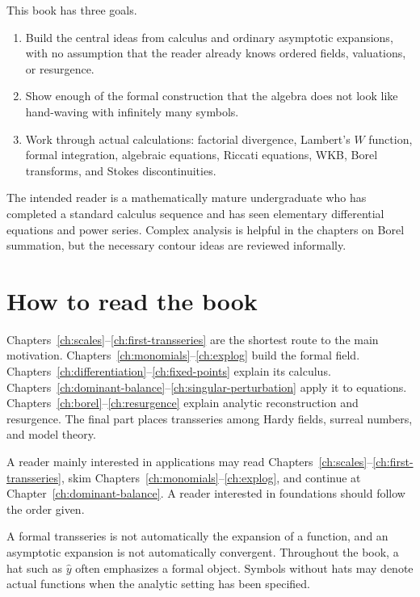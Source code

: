 \documentclass[11pt,openany]{book}
\theoremstyle{definition}
\theoremstyle{plain}
\theoremstyle{remark}
\newcommand{\trans}[1]{\widehat{#1}}
\begin{document}
This book has three goals.

\begin{enumerate}
\item Build the central ideas from calculus and ordinary asymptotic expansions, with no assumption that the reader already knows ordered fields, valuations, or resurgence.
\item Show enough of the formal construction that the algebra does not look like hand-waving with infinitely many symbols.
\item Work through actual calculations: factorial divergence, Lambert's $W$ function, formal integration, algebraic equations, Riccati equations, WKB, Borel transforms, and Stokes discontinuities.
\end{enumerate}

The intended reader is a mathematically mature undergraduate who has completed a standard calculus sequence and has seen elementary differential equations and power series. Complex analysis is helpful in the chapters on Borel summation, but the necessary contour ideas are reviewed informally.

\section*{How to read the book}

Chapters~\ref{ch:scales}--\ref{ch:first-transseries} are the shortest route to the main motivation. Chapters~\ref{ch:monomials}--\ref{ch:explog} build the formal field. Chapters~\ref{ch:differentiation}--\ref{ch:fixed-points} explain its calculus. Chapters~\ref{ch:dominant-balance}--\ref{ch:singular-perturbation} apply it to equations. Chapters~\ref{ch:borel}--\ref{ch:resurgence} explain analytic reconstruction and resurgence. The final part places transseries among Hardy fields, surreal numbers, and model theory.

A reader mainly interested in applications may read Chapters~\ref{ch:scales}--\ref{ch:first-transseries}, skim Chapters~\ref{ch:monomials}--\ref{ch:explog}, and continue at Chapter~\ref{ch:dominant-balance}. A reader interested in foundations should follow the order given.

\begin{warningbox}
A formal transseries is not automatically the expansion of a function, and an asymptotic expansion is not automatically convergent. Throughout the book, a hat such as $\trans y$ often emphasizes a formal object. Symbols without hats may denote actual functions when the analytic setting has been specified.
\end{warningbox}
\end{document}
